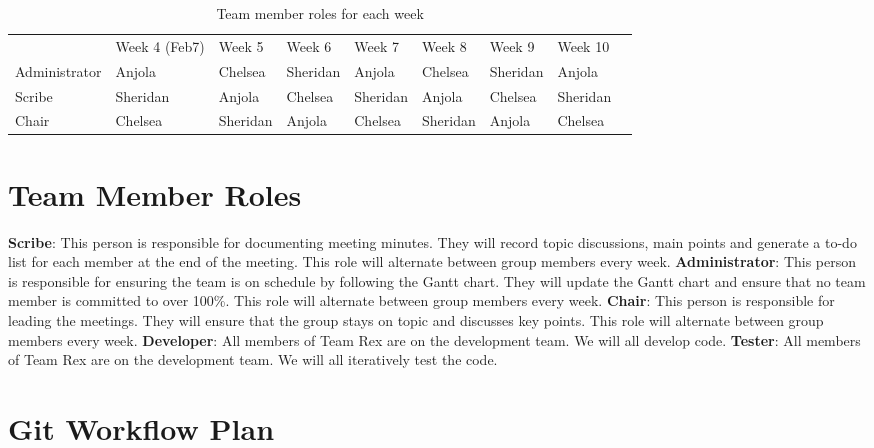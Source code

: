 \documentclass{article}
\begin{document}
	
	\begin{table}[hbt!]
		\centering
		\caption{Team member roles for each week}
		\smallskip
		\begin{tabular}{|l|l|l|l|l|l|l|l|l}
			
		\cline{1-8}
		& Week 4 (Feb7) & Week 5   & Week 6   & Week 7   & Week 8   & Week 9   & Week 10  &  \\ \cline{1-8}
		Administrator & Anjola        & Chelsea  & Sheridan & Anjola   & Chelsea  & Sheridan & Anjola   &  \\ \cline{1-8}
		Scribe        & Sheridan      & Anjola   & Chelsea  & Sheridan & Anjola   & Chelsea  & Sheridan &  \\ \cline{1-8}
		Chair         & Chelsea       & Sheridan & Anjola   & Chelsea  & Sheridan & Anjola   & Chelsea  &  \\ \cline{1-8}
		\end{tabular}
	
	\end{table}

	\bigskip
	
	\bigskip
	
	\bigskip
	\bigskip
 

	\section{Team Member Roles}
	
	\textbf{Scribe}: This person is responsible for documenting meeting minutes. They will record topic discussions, main points and generate a to-do list for each member at the end of the meeting. This role will alternate between group members every week. 
	\textbf{Administrator}: This person is responsible for ensuring the team is on schedule by following the Gantt chart. They will update the Gantt chart and ensure that no team member is committed to over 100\%. This role will alternate between group members every week. 
	\textbf{Chair}: This person is responsible for leading the meetings. They will ensure that the group stays on topic and discusses key points. This role will alternate between group members every week. 
	\textbf{Developer}: All members of Team Rex are on the development team. We will all develop code. 
	\textbf{Tester}: All members of Team Rex are on the development team. We will all iteratively test the code. 
	
	
	
	\section{Git Workflow Plan}
\end{document}
